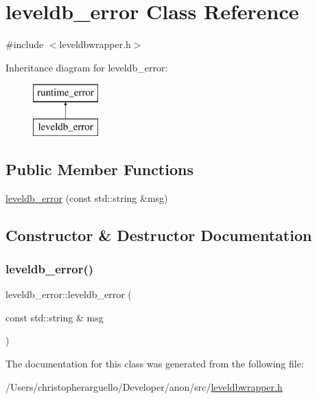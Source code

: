 \hypertarget{classleveldb__error}{}\section{leveldb\+\_\+error Class Reference}
\label{classleveldb__error}


{\ttfamily \#include $<$leveldbwrapper.\+h$>$}

Inheritance diagram for leveldb\+\_\+error\+:\begin{figure}[H]
\begin{center}
\leavevmode
\includegraphics[height=2.000000cm]{classleveldb__error}
\end{center}
\end{figure}
\subsection*{Public Member Functions}
\begin{DoxyCompactItemize}
\item 
\mbox{\hyperlink{classleveldb__error_a20e012c5a8f796abd5c5af3f7829ee07}{leveldb\+\_\+error}} (const std\+::string \&msg)
\end{DoxyCompactItemize}


\subsection{Constructor \& Destructor Documentation}
\mbox{\label{classleveldb__error_a20e012c5a8f796abd5c5af3f7829ee07}} 
\subsubsection{\texorpdfstring{leveldb\+\_\+error()}{leveldb\_error()}}
{\footnotesize\ttfamily leveldb\+\_\+error\+::leveldb\+\_\+error (\begin{DoxyParamCaption}\item[{const std\+::string \&}]{msg }\end{DoxyParamCaption})\hspace{0.3cm}{\ttfamily [inline]}}



The documentation for this class was generated from the following file\+:\begin{DoxyCompactItemize}
\item 
/\+Users/christopherarguello/\+Developer/anon/src/\mbox{\hyperlink{leveldbwrapper_8h}{leveldbwrapper.\+h}}\end{DoxyCompactItemize}
